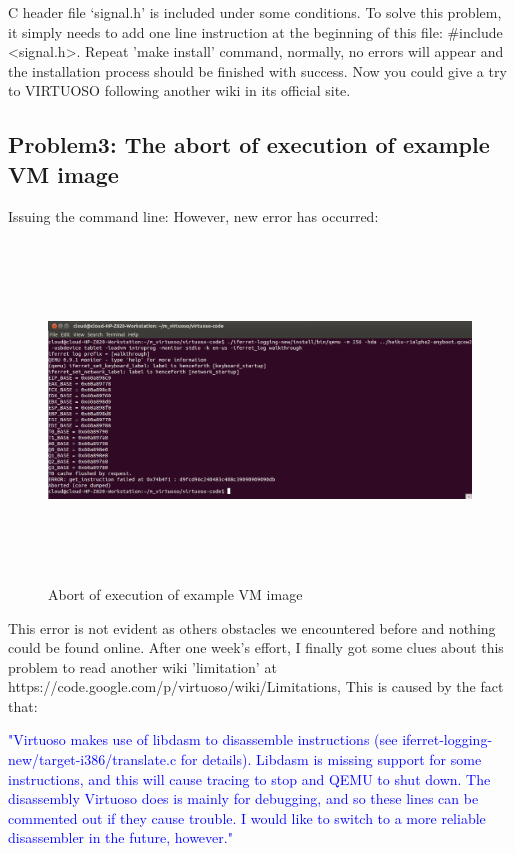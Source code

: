 C header file ‘signal.h’ is included under some conditions. To solve this problem, it simply needs to  add one line instruction at the 
beginning of this file: \#include <signal.h>. Repeat 'make install' command, normally, no errors will appear and the installation process 
should be finished with success. Now you could give a try to VIRTUOSO following another wiki in its official site.

\subsection{Problem3: The abort of execution of example VM image}
Issuing the command line:
However, new error has occurred:

\begin{figure}[htbp]
	\centering
		\includegraphics[width=14cm, height= 9cm ]{Figures/Figure35.png}
	\caption[Abort of execution of example VM image]{Abort of execution of example VM image}
	\label{fig:Abort of execution of example VM image}
\end{figure}

This error is not evident as others obstacles we encountered before and nothing could be found online. After one week’s effort, 
I finally got some clues about this problem to read another wiki 'limitation' at https://code.google.com/p/virtuoso/wiki/Limitations,
This is caused by the fact that:

\textcolor{blue}{
  "Virtuoso makes use of libdasm to disassemble instructions (see iferret-logging-new/target-i386/translate.c for details). 
  Libdasm is missing support for some instructions, and this will cause tracing to stop and QEMU to shut down. The disassembly Virtuoso does 
  is mainly for debugging, and so these lines can be commented out if they cause trouble. I would like to switch to a more reliable disassembler 
  in the future, however."
}

